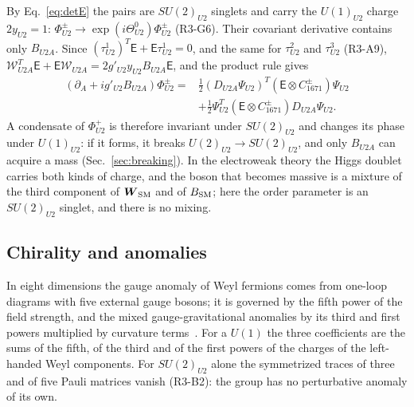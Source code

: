 By Eq.~\eqref{eq:detE} the pairs are $SU(2)_{U2}$ singlets and carry the $U(1)_{U2}$ charge
$2y_{U2}=1$: $\Phi^\pm_{U2}\to\exp(i\Theta^0_{U2})\Phi^\pm_{U2}$ (R3-G6). Their covariant derivative
contains only $B_{U2A}$. Since $(\tau^1_{U2})^T\mathsf E+\mathsf E\tau^1_{U2}=0$, and the same for
$\tau^2_{U2}$ and $\tau^3_{U2}$ (R3-A9), $\mathcal W^T_{U2A}\mathsf E+\mathsf E\mathcal W_{U2A}
=2g'_{U2}y_{U2}B_{U2A}\mathsf E$, and the product rule gives
\begin{equation}
\begin{aligned}
(\partial_A+ig'_{U2}B_{U2A})\Phi^\pm_{U2}={}&\tfrac12(D_{U2A}\Psi_{U2})^T(\mathsf E\otimes C^\pm_{1671})\Psi_{U2}\\
&+\tfrac12\Psi^T_{U2}(\mathsf E\otimes C^\pm_{1671})D_{U2A}\Psi_{U2}.
\end{aligned}
\label{eq:Dpair}
\end{equation}
A condensate of $\Phi^+_{U2}$ is therefore invariant under $SU(2)_{U2}$ and changes its phase under
$U(1)_{U2}$: if it forms, it breaks $U(2)_{U2}\to SU(2)_{U2}$, and only $B_{U2A}$ can acquire a mass
(Sec.~\ref{sec:breaking}). In the electroweak theory the Higgs doublet carries both kinds of
charge, and the boson that becomes massive is a mixture of the third component of $\boldsymbol W_{\rm SM}$
and of $B_{\rm SM}$; here the order parameter
is an $SU(2)_{U2}$ singlet, and there is no mixing.

\subsection{Chirality and anomalies}

In eight dimensions the gauge anomaly of Weyl fermions comes from one-loop diagrams with five
external gauge bosons; it is governed by the fifth power of the field strength, and the mixed
gauge-gravitational anomalies by its third and first powers multiplied by curvature
terms~\cite{AlvarezGaumeWitten1984}. For a $U(1)$ the three coefficients are the sums of the fifth, of the third and of the first
powers of the charges of the left-handed Weyl components.
For $SU(2)_{U2}$ alone the symmetrized traces of three and of five Pauli matrices vanish
(R3-B2): the group has no perturbative anomaly of its own.

